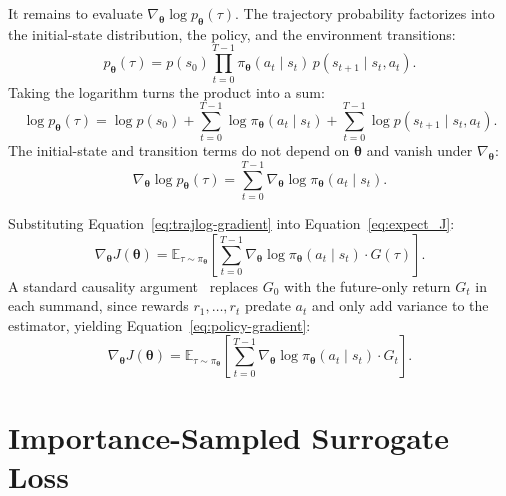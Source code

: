 \medskip

It remains to evaluate $\nabla_{\boldsymbol{\theta}} \log p_{\boldsymbol{\theta}}(\tau)$. The trajectory probability factorizes into the initial-state distribution, the policy, and the environment transitions:
\begin{equation}
p_{\boldsymbol{\theta}}(\tau) = p(s_0) \prod_{t=0}^{T-1} 
\pi_{\boldsymbol{\theta}}(a_t \mid s_t) \, p(s_{t+1} \mid s_t, a_t).
\label{eq:trajectory-prob}
\end{equation}
Taking the logarithm turns the product into a sum:
\begin{equation}
\log p_{\boldsymbol{\theta}}(\tau) = \log p(s_0) 
+ \sum_{t=0}^{T-1} \log \pi_{\boldsymbol{\theta}}(a_t \mid s_t)
+ \sum_{t=0}^{T-1} \log p(s_{t+1} \mid s_t, a_t).
\end{equation}
The initial-state and transition terms do not depend on $\boldsymbol{\theta}$ and vanish under $\nabla_{\boldsymbol{\theta}}$:
\begin{equation}
\nabla_{\boldsymbol{\theta}} \log p_{\boldsymbol{\theta}}(\tau) 
= \sum_{t=0}^{T-1} \nabla_{\boldsymbol{\theta}} \log 
\pi_{\boldsymbol{\theta}}(a_t \mid s_t).
\label{eq:trajlog-gradient}
\end{equation}

Substituting Equation~\ref{eq:trajlog-gradient} 
into  Equation~\ref{eq:expect_J}:
\begin{equation}
\nabla_{\boldsymbol{\theta}} J(\boldsymbol{\theta}) 
= \mathbb{E}_{\tau \sim \pi_{\boldsymbol{\theta}}} 
\left[ \sum_{t=0}^{T-1} \nabla_{\boldsymbol{\theta}} 
\log \pi_{\boldsymbol{\theta}}(a_t \mid s_t) \cdot G(\tau) \right].
\end{equation}
A standard causality argument~\cite{suttonReinforcementLearningIntroduction2020} replaces $G_0$ with the future-only return $G_t$ in each summand, since rewards $r_1, \ldots, r_t$ predate $a_t$ and only add variance to the estimator, yielding Equation~\ref{eq:policy-gradient}:
\begin{equation}
\nabla_{\boldsymbol{\theta}} J(\boldsymbol{\theta}) 
= \mathbb{E}_{\tau \sim \pi_{\boldsymbol{\theta}}} 
\left[ \sum_{t=0}^{T-1} \nabla_{\boldsymbol{\theta}} 
\log \pi_{\boldsymbol{\theta}}(a_t \mid s_t) \cdot G_t \right].
\label{eq:policy-grad}
\end{equation}

\section{Importance-Sampled Surrogate Loss}
\label{app:pg-surrogate}

